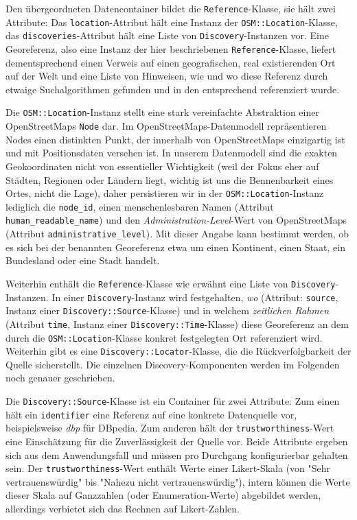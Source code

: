 Den übergeordneten Datencontainer bildet die \texttt{Reference}-Klasse, sie hält zwei Attribute: Das \texttt{location}-Attribut hält eine Instanz der \texttt{OSM::Location}-Klasse, das \texttt{discoveries}-Attribut hält eine Liste von \texttt{Discovery}-Instanzen vor. Eine Georeferenz, also eine Instanz der hier beschriebenen  \texttt{Reference}-Klasse, liefert dementsprechend einen Verweis auf einen geografischen, real existierenden Ort auf der Welt und eine Liste von Hinweisen, wie und wo diese Referenz durch etwaige Suchalgorithmen gefunden und in den entsprechend referenziert wurde.

Die \texttt{OSM::Location}-Instanz stellt eine stark vereinfachte Abstraktion einer OpenStreetMaps \texttt{Node}\cite{OSMnode} dar. Im OpenStreetMaps-Datenmodell repräsentieren Nodes einen distinkten Punkt, der innerhalb von OpenStreetMaps einzigartig ist und mit Positionsdaten versehen ist. In unserem Datenmodell sind die exakten Geokoordinaten nicht von essentieller Wichtigkeit (weil der Fokus eher auf Städten, Regionen oder Ländern liegt, wichtig ist uns die Bennenbarkeit eines Ortes, nicht die Lage), daher persistieren wir in der \texttt{OSM::Location}-Instanz lediglich die \texttt{node\_id}, einen menschenlesbaren Namen (Attribut \texttt{human\_readable\_name}) und den \textit{Administration-Level}-Wert von OpenStreetMaps\cite{OSMadminlevel} (Attribut \texttt{administrative\_level}). Mit dieser Angabe kann bestimmt werden, ob es sich bei der benannten Georeferenz etwa um einen Kontinent, einen Staat, ein Bundesland oder eine Stadt handelt.

Weiterhin enthält die \texttt{Reference}-Klasse wie erwähnt eine Liste von \texttt{Discovery}-Instanzen. In einer \texttt{Discovery}-Instanz wird festgehalten, \textit{wo} (Attribut: \texttt{source}, Instanz einer \texttt{Discovery::Source}-Klasse) und in welchem \textit{zeitlichen Rahmen} (Attribut \texttt{time}, Instanz einer \texttt{Discovery::Time}-Klasse) diese Georeferenz an dem durch die \texttt{OSM::Location}-Klasse konkret festgelegten Ort referenziert wird. Weiterhin gibt es eine \texttt{Discovery::Locator}-Klasse, die die Rückverfolgbarkeit der Quelle sicherstellt. Die einzelnen Discovery-Komponenten werden im Folgenden noch genauer geschrieben.

Die \texttt{Discovery::Source}-Klasse ist ein Container für zwei Attribute: Zum einen hält ein \texttt{identifier} eine Referenz auf eine konkrete Datenquelle vor, beispielsweise \textit{dbp} für DBpedia. Zum anderen hält der \texttt{trustworthiness}-Wert eine Einschätzung für die Zuverlässigkeit der Quelle vor. Beide Attribute ergeben sich aus dem Anwendungsfall und müssen pro Durchgang konfigurierbar gehalten sein. Der \texttt{trustworthiness}-Wert enthält Werte einer Likert-Skala (von "Sehr vertrauenswürdig" bis "Nahezu nicht vertrauenswürdig"), intern können die Werte dieser Skala auf Ganzzahlen (oder Enumeration-Werte) abgebildet werden, allerdings verbietet sich das Rechnen auf Likert-Zahlen.

